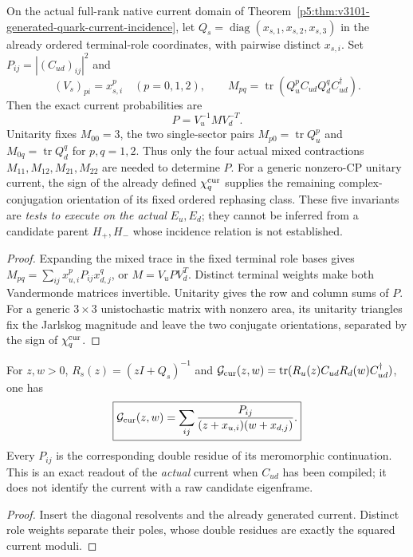 \documentclass[12pt,a4paper]{article}
\begin{document}
\begin{theorem}
\label{p5:thm:v240-five-quark-current-invariants}
On the actual full-rank native current domain of
Theorem~\ref{p5:thm:v3101-generated-quark-current-incidence}, let
$Q_s=\operatorname{diag}(x_{s,1},x_{s,2},x_{s,3})$ in the already
ordered terminal-role coordinates, with pairwise distinct $x_{s,i}$.
Set $P_{ij}=|(C_{ud})_{ij}|^2$ and
\[
 (V_s)_{pi}=x_{s,i}^p\quad (p=0,1,2),\qquad
 M_{pq}=\operatorname{tr}(Q_u^pC_{ud}Q_d^qC_{ud}^\dagger).
\]
Then the exact current probabilities are
\begin{equation}\label{p5:eq:v240-quark-vandermonde-current}
 \boxed{P=V_u^{-1}MV_d^{-T}.}
\end{equation}
Unitarity fixes $M_{00}=3$, the two single-sector pairs
$M_{p0}=\operatorname{tr}Q_u^p$ and
$M_{0q}=\operatorname{tr}Q_d^q$ for $p,q=1,2$.
Thus only the four actual mixed contractions
$M_{11},M_{12},M_{21},M_{22}$ are needed to determine $P$.
For a generic nonzero-CP unitary current, the sign of the already
defined $\chi_q^{\rm cur}$ supplies the remaining
complex-conjugation orientation of its fixed ordered rephasing class.
These five invariants are \emph{tests to execute on the actual}
$E_u,E_d$; they cannot be inferred from a candidate parent
$H_+,H_-$ whose incidence relation is not established.
\end{theorem}
\begin{proof}
Expanding the mixed trace in the fixed terminal role bases gives
$M_{pq}=\sum_{ij}x_{u,i}^p P_{ij}x_{d,j}^q$, or
$M=V_uPV_d^T$. Distinct terminal weights make both Vandermonde
matrices invertible. Unitarity gives the row and column sums of $P$.
For a generic $3\times3$ unistochastic matrix with nonzero area,
its unitarity triangles fix the Jarlskog magnitude and leave the
two conjugate orientations, separated by the sign of $\chi_q^{\rm cur}$.
\end{proof}
\begin{corollary}
\label{p5:cor:v240-native-current-stieltjes}
For $z,w>0$, $R_s(z)=(zI+Q_s)^{-1}$ and
$\mathcal G_{\rm cur}(z,w)=\operatorname{tr}(R_u(z)C_{ud}
R_d(w)C_{ud}^\dagger)$, one has
\[
 \boxed{\mathcal G_{\rm cur}(z,w)=
       \sum_{ij}\frac{P_{ij}}{(z+x_{u,i})(w+x_{d,j})}.}
\]
Every $P_{ij}$ is the corresponding double residue of its
meromorphic continuation. This is an exact readout of the
\emph{actual} current when $C_{ud}$ has been compiled; it does not
identify the current with a raw candidate eigenframe.
\end{corollary}
\begin{proof}
Insert the diagonal resolvents and the already generated current.
Distinct role weights separate their poles, whose double residues
are exactly the squared current moduli.
\end{proof}
\end{document}
